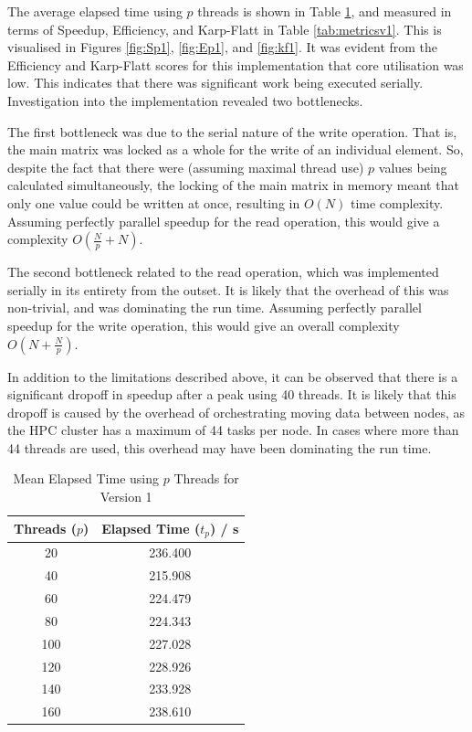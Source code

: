 The average elapsed time using $p$ threads is shown in Table \ref{tab:timev1}, and measured in terms of Speedup, Efficiency, and Karp-Flatt in Table \ref{tab:metricsv1}. This is visualised in Figures \ref{fig:Sp1}, \ref{fig:Ep1}, and \ref{fig:kf1}. It was evident from the Efficiency and Karp-Flatt scores for this implementation that core utilisation was low. This indicates that there was significant work being executed serially. Investigation into the implementation revealed two bottlenecks.

The first bottleneck was due to the serial nature of the write operation. That is, the main matrix was locked as a whole for the write of an individual element. So, despite the fact that there were (assuming maximal thread use) $p$ values being calculated simultaneously, the locking of the main matrix in memory meant that only one value could be written at once, resulting in $O(N)$ time complexity. Assuming perfectly parallel speedup for the read operation, this would give a complexity $O(\frac{N}{p} + N)$.

The second bottleneck related to the read operation, which was implemented serially in its entirety from the outset. It is likely that the overhead of this was non-trivial, and was dominating the run time. Assuming perfectly parallel speedup for the write operation, this would give an overall complexity $O(N + \frac{N}{p})$.

In addition to the limitations described above, it can be observed that there is a significant dropoff in speedup after a peak using 40 threads. It is likely that this dropoff is caused by the overhead of orchestrating moving data between nodes, as the HPC cluster has a maximum of 44 tasks per node. In cases where more than 44 threads are used, this overhead may have been dominating the run time.

\begin{table}[H]
    \centering
    \begin{tabular}{cc}
    \textbf{Threads ($p$)} & \textbf{Elapsed Time ($t_p$) / s} \\ \hline
    20 & 236.400 \\
    40 & 215.908 \\
    60 & 224.479 \\
    80 & 224.343 \\
    100 & 227.028 \\
    120 & 228.926 \\
    140 & 233.928 \\
    160 & 238.610
    \end{tabular}
    \caption{Mean Elapsed Time using $p$ Threads for Version 1}
    \label{tab:timev1}
\end{table}

